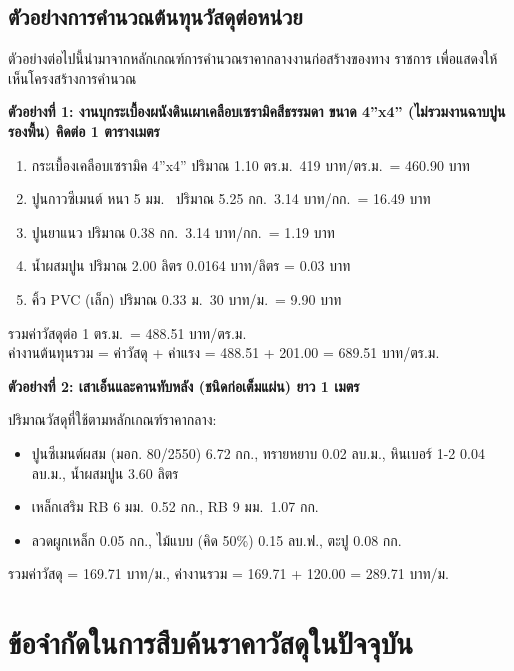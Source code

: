 \subsection{ตัวอย่างการคำนวณต้นทุนวัสดุต่อหน่วย}

ตัวอย่างต่อไปนี้นำมาจากหลักเกณฑ์การคำนวณราคากลางงานก่อสร้างของทาง
ราชการ \cite{cgd2569} เพื่อแสดงให้เห็นโครงสร้างการคำนวณ

\textbf{ตัวอย่างที่ 1: งานบุกระเบื้องผนังดินเผาเคลือบเซรามิคสีธรรมดา
ขนาด 4''x4'' (ไม่รวมงานฉาบปูนรองพื้น) คิดต่อ 1 ตารางเมตร}

\begin{enumerate}[leftmargin=2em,itemsep=0.2em]
  \item กระเบื้องเคลือบเซรามิค 4''x4'' \quad
        ปริมาณ 1.10 ตร.ม.\ \@ 419 บาท/ตร.ม.\ = 460.90 บาท
  \item ปูนกาวซีเมนต์ หนา 5 มม.\ \quad
        ปริมาณ 5.25 กก.\ \@ 3.14 บาท/กก.\ = 16.49 บาท
  \item ปูนยาแนว \quad
        ปริมาณ 0.38 กก.\ \@ 3.14 บาท/กก.\ = 1.19 บาท
  \item น้ำผสมปูน \quad
        ปริมาณ 2.00 ลิตร \@ 0.0164 บาท/ลิตร = 0.03 บาท
  \item คิ้ว PVC (เล็ก) \quad
        ปริมาณ 0.33 ม.\ \@ 30 บาท/ม.\ = 9.90 บาท
\end{enumerate}

รวมค่าวัสดุต่อ 1 ตร.ม.\ = 488.51 บาท/ตร.ม.\\
ค่างานต้นทุนรวม = ค่าวัสดุ + ค่าแรง = 488.51 + 201.00 = 689.51 บาท/ตร.ม.

\textbf{ตัวอย่างที่ 2: เสาเอ็นและคานทับหลัง (ชนิดก่อเต็มแผ่น) ยาว 1 เมตร}

ปริมาณวัสดุที่ใช้ตามหลักเกณฑ์ราคากลาง:

\begin{itemize}[leftmargin=2em,itemsep=0.1em]
  \item ปูนซีเมนต์ผสม (มอก. 80/2550) 6.72 กก., ทรายหยาบ 0.02 ลบ.ม.,
        หินเบอร์ 1-2 0.04 ลบ.ม., น้ำผสมปูน 3.60 ลิตร
  \item เหล็กเสริม RB 6 มม.\ 0.52 กก., RB 9 มม.\ 1.07 กก.
  \item ลวดผูกเหล็ก 0.05 กก., ไม้แบบ (คิด 50\%) 0.15 ลบ.ฟ.,
        ตะปู 0.08 กก.
\end{itemize}

รวมค่าวัสดุ = 169.71 บาท/ม., ค่างานรวม = 169.71 + 120.00 = 289.71 บาท/ม.

\section{ข้อจำกัดในการสืบค้นราคาวัสดุในปัจจุบัน}
\label{sec:limit-current}

